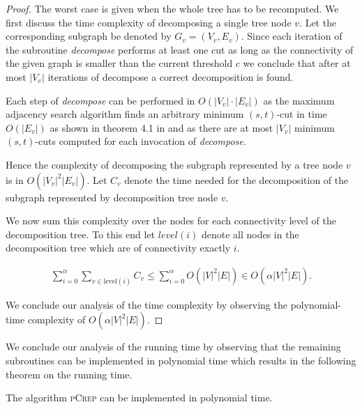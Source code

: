 \documentclass[a4paper,UKenglish,cleveref, autoref, thm-restate,authorcolumns]{lipics-v2019}
\newcommand{\adjDel}{\textsc{pCrep}}
\begin{document}
\begin{proof}
	The worst case is given when the whole tree has to be recomputed. We first discuss the time complexity of decomposing a single tree node $v$. Let the corresponding subgraph be denoted by $G_v=(V_v, E_v)$.
	Since each iteration of the subroutine \textit{decompose} performs at least one cut as long as the connectivity of the given graph is smaller than the current threshold $c$ we conclude that after at most $|V_v|$ iterations of decompose a correct decomposition is found. 
	
	Each step of \textit{decompose} can be performed in $O(|V_v|\cdot|E_v|)$ as the maximum adjacency search algorithm finds an arbitrary minimum $(s,t)$-cut in time $O(|E_v|)$ as shown in theorem 4.1 in \cite{Chang2013} and as there are at most $|V_v|$ minimum $(s,t)$-cuts computed for each invocation of \textit{decompose}.
	
	Hence the complexity of decomposing the subgraph represented by a tree node $v$ is in $O(|V_v|^2|E_v|)$. Let $C_v$ denote the time needed for the decomposition of the subgraph represented  by decomposition tree node $v$.
	
	We now sum this complexity over the nodes for each connectivity level of the decomposition tree. To this end let $level(i)$ denote all nodes in the decomposition tree which are of connectivity exactly $i$.
	
	\begin{align*}
	\sum_{i=0}^{\alpha}\sum_{v\in \text{level}(i)}C_v\leq\sum_{i=0}^{\alpha}O(|V|^2|E|)\in O(\alpha|V|^2|E|).
	\end{align*}
	
	We conclude our analysis of the time complexity by observing the polynomial-time complexity of $O(\alpha|V|^2|E|)$.
\end{proof}


We conclude our analysis of the running time by observing that the remaining subroutines can be implemented in polynomial time which results in the following theorem on the running time.

\begin{theorem}
	\label{run_time_theo}
	The algorithm \adjDel{} can be implemented in polynomial time.
\end{theorem}
\end{document}
